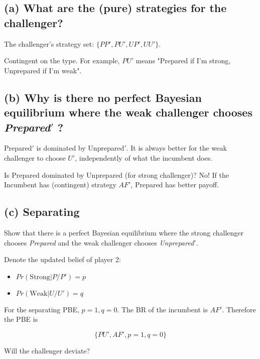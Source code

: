 \documentclass{article}
\begin{document}
\medskip

\subsection*{(a) What are the (pure) strategies for the challenger?} 


The challenger's strategy set: $\{PP', PU', UP', UU'\}$.

\begin{mdframed}[backgroundcolor=blue!20,linecolor=white]
Contingent on the type. For example, $PU'$ means "Prepared if I'm strong, Unprepared if I'm weak".
\end{mdframed}

\subsection*{(b) Why is there no perfect Bayesian equilibrium where the weak challenger chooses
\textit{Prepared}$'$ ? }

Prepared$'$ is dominated by Unprepared$'$.
It is always better for the weak challenger to choose $U'$, independently of
what the incumbent does.

\begin{mdframed}[backgroundcolor=blue!20,linecolor=white]
Is {Prepared} dominated by {Unprepared} (for strong challenger)?
No! If the Incumbent has (contingent) strategy $AF'$, Prepared has better payoff.
\end{mdframed}

\subsection*{(c) Separating}Show that there is a perfect Bayesian equilibrium where the strong challenger chooses
\textit{Prepared} and the weak challenger chooses \textit{Unprepared}$'$. 

Denote the updated belief of player 2:
\begin{itemize}
\item $Pr(\text{Strong} | P/P') = p$
\item $Pr(\text{Weak} | U/U') = q$
\end{itemize}

For the separating PBE, $p=1,q=0$. The BR of the incumbent is
$AF'$. Therefore the PBE is

$$\{PU',AF',p=1,q=0\}$$

\begin{mdframed}[backgroundcolor=blue!20,linecolor=white]
Will the challenger deviate?
\end{mdframed}
\end{document}
